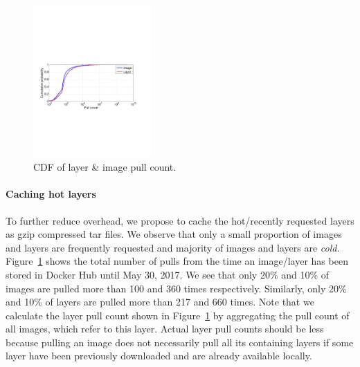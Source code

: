 \begin{figure}
	\centering
	\includegraphics[width=0.4\textwidth]{graphs/pull-cnt.pdf}
	\caption{CDF of layer \& image pull count.
	}
	\label{fig:pull-cnt}
\end{figure}

\paragraph{Caching hot layers}

To further reduce overhead, we propose to cache the hot/recently requested layers as
gzip compressed tar files.
%
We observe that only a small proportion of images
and layers are frequently requested and majority of images and layers are
\textit{cold}.
%
Figure~\ref{fig:pull-cnt} shows the total
number of pulls from the time an image/layer has been stored in Docker Hub until
May 30, 2017.
%
We see that only 20\% and 10\% of images are pulled more than 100 and
360 times respectively.
%
Similarly, only 20\% and 10\% of layers are pulled
more than 217 and 660 times.
%
Note that we calculate the layer pull count shown in
Figure~\ref{fig:pull-cnt} by aggregating the pull count of
all images, which refer to this layer.
%
%
Actual layer pull counts should be less because pulling an image does not
necessarily pull all its containing layers if some layer have been previously
downloaded and are already available locally.
%

%


%
%

